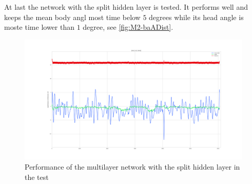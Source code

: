 \newline
At last the network with the split hidden layer is tested. It performs well and keeps the mean body angl most time below $5$ degrees while its head angle is moste time lower than $1$ degree, see \autoref{fig:M2-baADist}.
\begin{figure}[htpb]
  \centering
  \includegraphics[width=\textwidth]{figures/plots/M2-baADist}
  \caption{ Performance of the multilayer network with the split hidden layer in the test }
  \label{fig:M2-baADist}
\end{figure}



